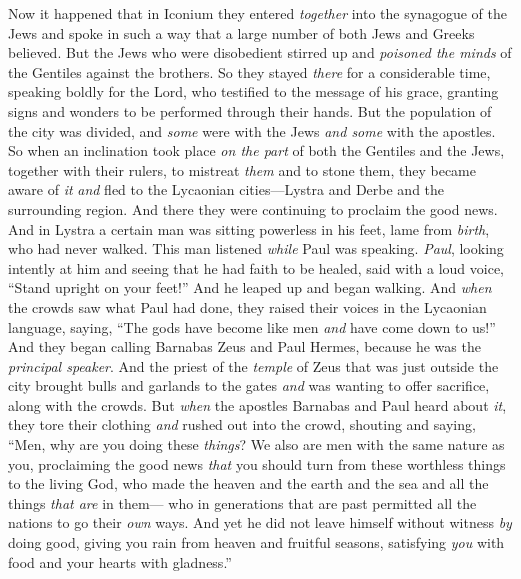 \begin{biblechapter} %
 Now it happened that in Iconium they entered \textit{together} into the synagogue of the Jews and spoke in such a way that a large number of both Jews and Greeks believed.
\verse But the Jews who were disobedient stirred up and \textit{poisoned the minds} of the Gentiles against the brothers.
\verse So they stayed \textit{there} for a considerable time, speaking boldly for the Lord, who testified to the message of his grace, granting signs and wonders to be performed through their hands.
\verse But the population of the city was divided, and \textit{some} were with the Jews \textit{and some} with the apostles.
\verse So when an inclination took place \textit{on the part} of both the Gentiles and the Jews, together with their rulers, to mistreat \textit{them} and to stone them,
\verse they became aware of \textit{it} \textit{and} fled to the Lycaonian cities—Lystra and Derbe and the surrounding region.
\verse And there they were continuing to proclaim the good news.
 And in Lystra a certain man was sitting powerless in his feet, lame from \textit{birth}, who had never walked.
\verse This man listened \textit{while} Paul was speaking. \textit{Paul}, looking intently at him and seeing that he had faith to be healed,
\verse said with a loud voice, “Stand upright on your feet!” And he leaped up and began walking.
\verse And \textit{when} the crowds saw what Paul had done, they raised their voices in the Lycaonian language, saying, “The gods have become like men \textit{and} have come down to us!”
\verse And they began calling Barnabas Zeus and Paul Hermes, because he was the \textit{principal speaker}.
\verse And the priest of the \textit{temple} of Zeus that was just outside the city brought bulls and garlands to the gates \textit{and} was wanting to offer sacrifice, along with the crowds.
\verse But \textit{when} the apostles Barnabas and Paul heard about \textit{it}, they tore their clothing \textit{and} rushed out into the crowd, shouting
\verse and saying, “Men, why are you doing these \textit{things}? We also are men with the same nature as you, proclaiming the good news \textit{that} you should turn from these worthless things to the living God, who made the heaven and the earth and the sea and all the things \textit{that are} in them—
\verse who in generations that are past permitted all the nations to go their \textit{own} ways.
\verse And yet he did not leave himself without witness \textit{by} doing good, giving you rain from heaven and fruitful seasons, satisfying \textit{you} with food and your hearts with gladness.”

\end{biblechapter}
